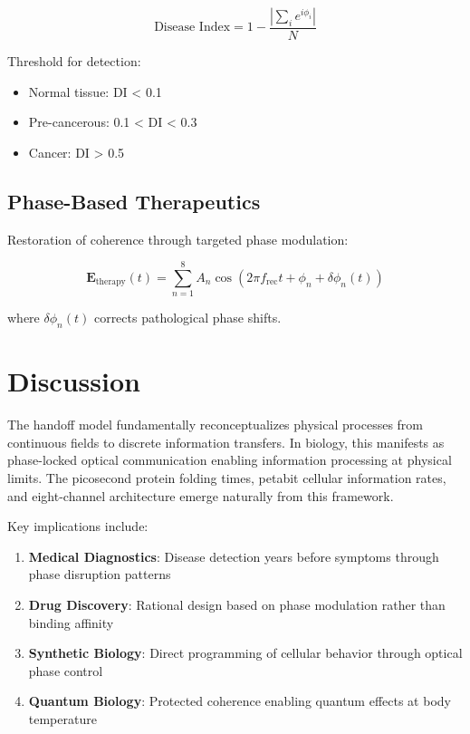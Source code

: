 \documentclass[12pt,twocolumn]{article}
\begin{document}
\begin{equation}
\text{Disease Index} = 1 - \frac{|\sum_i e^{i\phi_i}|}{N}
\end{equation}

Threshold for detection:
\begin{itemize}
\item Normal tissue: DI < 0.1
\item Pre-cancerous: 0.1 < DI < 0.3
\item Cancer: DI > 0.5
\end{itemize}

\subsection{Phase-Based Therapeutics}

Restoration of coherence through targeted phase modulation:

\begin{equation}
\mathbf{E}_{\text{therapy}}(t) = \sum_{n=1}^{8} A_n \cos(2\pi f_{\text{rec}} t + \phi_n + \delta\phi_n(t))
\end{equation}

where $\delta\phi_n(t)$ corrects pathological phase shifts.

\section{Discussion}

The handoff model fundamentally reconceptualizes physical processes from continuous fields to discrete information transfers. In biology, this manifests as phase-locked optical communication enabling information processing at physical limits. The picosecond protein folding times, petabit cellular information rates, and eight-channel architecture emerge naturally from this framework.

Key implications include:

\begin{enumerate}
\item \textbf{Medical Diagnostics}: Disease detection years before symptoms through phase disruption patterns
\item \textbf{Drug Discovery}: Rational design based on phase modulation rather than binding affinity
\item \textbf{Synthetic Biology}: Direct programming of cellular behavior through optical phase control
\item \textbf{Quantum Biology}: Protected coherence enabling quantum effects at body temperature
\end{enumerate}
\end{document}
